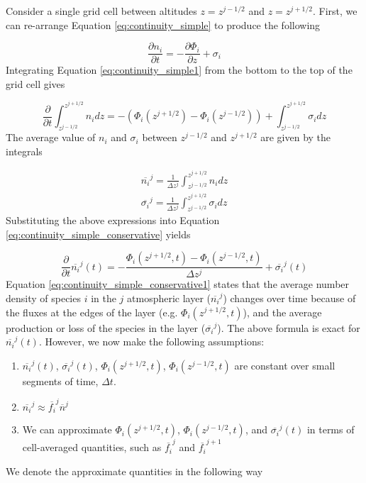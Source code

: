 Consider a single grid cell between altitudes $z = z^{j-1/2}$ and $z = z^{j+1/2}$. First, we can re-arrange Equation \eqref{eq:continuity_simple} to produce the following

\begin{equation} \label{eq:continuity_simple1}
  \frac{\partial n_i}{\partial t} = - \frac{\partial \Phi_{i}}{\partial z} + \sigma_i
\end{equation}
Integrating Equation \eqref{eq:continuity_simple1} from the bottom to the top of the grid cell gives

\begin{equation} \label{eq:continuity_simple_conservative}
  \frac{\partial}{\partial t} \int_{z^{j-1/2}}^{z^{j+1/2}} n_i dz = - (\Phi_{i}(z^{j+1/2}) - \Phi_{i}(z^{j-1/2})) + \int_{z^{j-1/2}}^{z^{j+1/2}} \sigma_i dz
\end{equation}
The average value of $n_i$ and $\sigma_i$ between $z^{j-1/2}$ and $z^{j+1/2}$ are given by the integrals

\begin{align}
  \overline{n_i}^j = \frac{1}{\Delta z^j} \int_{z^{j-1/2}}^{z^{j+1/2}} n_i dz \\
  \overline{\sigma_i}^j = \frac{1}{\Delta z^j} \int_{z^{j-1/2}}^{z^{j+1/2}} \sigma_i dz
\end{align}
Substituting the above expressions into Equation \eqref{eq:continuity_simple_conservative} yields

\begin{equation} \label{eq:continuity_simple_conservative1}
  \frac{\partial}{\partial t} \overline{n_i}^j(t) = - \frac{\Phi_{i}(z^{j+1/2},t) - \Phi_{i}(z^{j-1/2},t)}{\Delta z^j} + \overline{\sigma_i}^j(t)
\end{equation}
Equation \eqref{eq:continuity_simple_conservative1} states that the average number density of species $i$ in the $j$ atmospheric layer ($\overline{n_i}^j$) changes over time because of the fluxes at the edges of the layer (e.g. $\Phi_{i}(z^{j+1/2},t)$), and the average production or loss of the species in the layer ($\overline{\sigma_i}^j$). The above formula is exact for $\overline{n_i}^j(t)$. However, we now make the following assumptions:

\begin{enumerate}
  \item $\overline{n_i}^j(t)$, $\overline{\sigma_i}^j(t)$, $\Phi_{i}(z^{j+1/2},t)$, $\Phi_{i}(z^{j-1/2},t)$  are constant over small segments of time, $\Delta t$.
  \item $\overline{n_i}^j \approx \overline{f_i}^j \overline{n}^j$
  \item We can approximate $\Phi_{i}(z^{j+1/2},t)$, $\Phi_{i}(z^{j-1/2},t)$, and $\overline{\sigma_i}^j(t)$ in terms of cell-averaged quantities, such as $\overline{f_i}^j$ and $\overline{f_i}^{j+1}$
\end{enumerate}
We denote the approximate quantities in the following way

